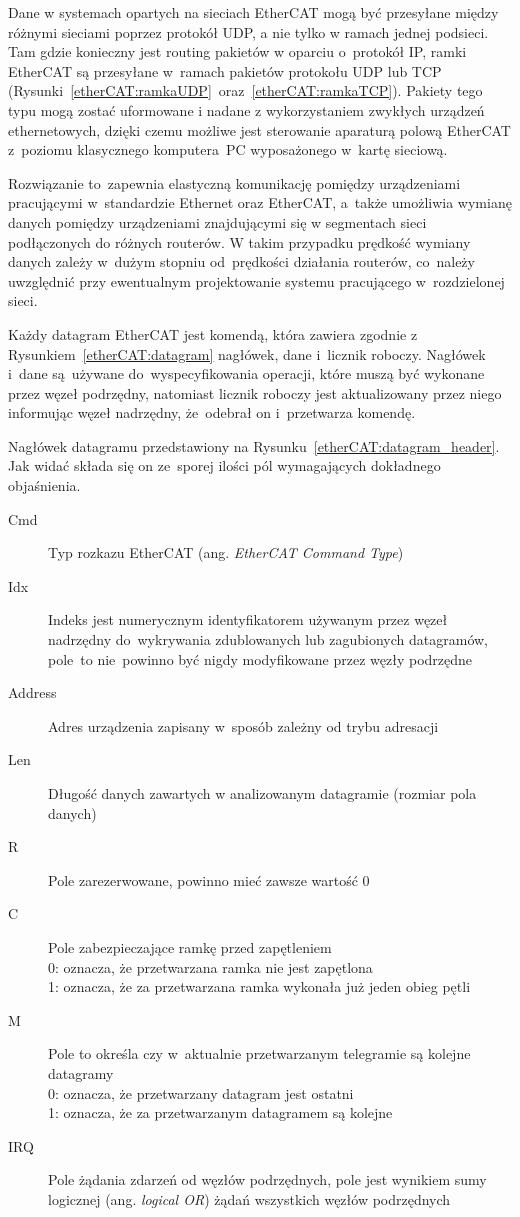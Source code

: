 Dane w systemach opartych na sieciach EtherCAT mogą być przesyłane między różnymi sieciami poprzez protokół UDP, a nie tylko w ramach jednej podsieci. Tam gdzie konieczny jest routing pakietów w oparciu o~protokół IP, ramki EtherCAT są przesyłane w~ramach pakietów protokołu UDP lub TCP (Rysunki~\ref{etherCAT:ramkaUDP}~oraz~\ref{etherCAT:ramkaTCP}). Pakiety tego typu mogą zostać uformowane i nadane z wykorzystaniem zwykłych urządzeń ethernetowych, dzięki czemu możliwe jest sterowanie aparaturą polową EtherCAT z~poziomu klasycznego komputera~PC wyposażonego w~kartę sieciową.

Rozwiązanie to~zapewnia elastyczną komunikację pomiędzy urządzeniami pracującymi w~standardzie Ethernet oraz EtherCAT, a~także umożliwia wymianę danych pomiędzy urządzeniami znajdującymi się w segmentach sieci podłączonych do różnych routerów. W takim przypadku prędkość wymiany danych zależy w~dużym stopniu od~prędkości działania routerów, co~należy uwzględnić przy ewentualnym projektowanie systemu pracującego w~rozdzielonej sieci.

Każdy datagram EtherCAT jest komendą, która zawiera zgodnie z Rysunkiem~\ref{etherCAT:datagram} nagłówek, dane i~licznik roboczy. Nagłówek i~dane są~używane do~wyspecyfikowania operacji, które muszą być wykonane przez węzeł podrzędny, natomiast licznik roboczy jest aktualizowany przez niego informując węzeł nadrzędny, że~odebrał on i~przetwarza komendę.

Nagłówek datagramu przedstawiony na Rysunku~\ref{etherCAT:datagram_header}. Jak widać składa się on ze~sporej ilości pól wymagających dokładnego objaśnienia.
\begin{description}
\item[Cmd] Typ rozkazu EtherCAT (ang. \textit{EtherCAT Command Type})
\item[Idx] Indeks jest numerycznym identyfikatorem używanym przez węzeł nadrzędny do~wykrywania zdublowanych lub zagubionych datagramów, pole~to nie~powinno być nigdy modyfikowane przez węzły podrzędne
\item[Address] Adres urządzenia zapisany w~sposób zależny od trybu adresacji
\item[Len] Długość danych zawartych w analizowanym datagramie (rozmiar pola danych)
\item[R] Pole zarezerwowane, powinno mieć zawsze wartość 0
\item[C] Pole zabezpieczające ramkę przed zapętleniem\\
0: oznacza, że przetwarzana ramka nie jest zapętlona \\
1: oznacza, że za przetwarzana ramka wykonała już jeden obieg pętli
\item[M] Pole to określa czy w~aktualnie przetwarzanym telegramie są kolejne datagramy \\
0: oznacza, że przetwarzany datagram jest ostatni \\
1: oznacza, że za przetwarzanym datagramem są kolejne
\item[IRQ] Pole żądania zdarzeń od węzłów podrzędnych, pole jest wynikiem sumy logicznej (ang. \textit{logical OR}) żądań wszystkich węzłów podrzędnych
\end{description}

